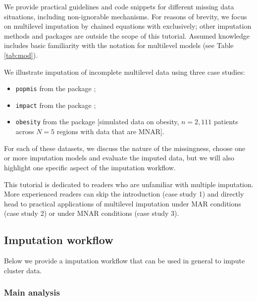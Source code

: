 \documentclass[
]{jss}
\providecommand{\tightlist}{%
  \setlength{\itemsep}{0pt}\setlength{\parskip}{0pt}}
\begin{document}
We provide practical guidelines and code snippets for different missing
data situations, including non-ignorable mechanisms. For reasons of
brevity, we focus on multilevel imputation by chained equations with
 exclusively; other imputation methods and packages \citep[see
e.g.][ and \citet{grun18}]{audi18} are outside the scope of this
tutorial. Assumed knowledge includes basic familiarity with the
 notation for multilevel models (see Table \ref{tab:mod}).

We illustrate imputation of incomplete multilevel data using three case
studies:

\begin{itemize}
\tightlist
\item
  \texttt{popmis} from the  package \citep[simulated data on
  perceived popularity, \(n = 2,000\) pupils across \(N = 100\) schools
  with data that are MAR,][]{mice};
\item
  \texttt{impact} from the  package \citep[empirical data
  on traumatic brain injuries, \(n = 11,022\) patients across \(N = 15\)
  studies with data that are MAR,][]{metamisc};
\item
  \texttt{obesity} from the  package {[}simulated data on
  obesity, \(n = 2,111\) patients across \(N = 5\) regions with data
  that are MNAR{]}.
\end{itemize}

For each of these datasets, we discuss the nature of the missingness,
choose one or more imputation models and evaluate the imputed data, but
we will also highlight one specific aspect of the imputation workflow.

This tutorial is dedicated to readers who are unfamiliar with multiple
imputation. More experienced readers can skip the introduction (case
study 1) and directly head to practical applications of multilevel
imputation under MAR conditions (case study 2) or under MNAR conditions
(case study 3).

\hypertarget{imputation-workflow}{%
\subsection{Imputation workflow}\label{imputation-workflow}}

Below we provide a imputation workflow that can be used in general to
impute cluster data.

\hypertarget{main-analysis}{%
\subsubsection{Main analysis}\label{main-analysis}}
\end{document}
